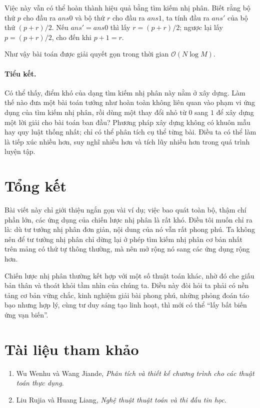 \documentclass[11pt]{article}
\newcommand{\Oh}{\mathcal{O}}
\begin{document}
Việc này vẫn có thể hoàn thành hiệu quả bằng tìm kiếm nhị phân. Biết rằng bộ
thứ $p$ cho đầu ra $\mathit{ans0}$ và bộ thứ $r$ cho đầu ra $\mathit{ans1}$,
ta tính đầu ra $\mathit{ans'}$ của bộ thứ $(p+r)/2$. Nếu
$\mathit{ans'}=\mathit{ans0}$ thì lấy $r=(p+r)/2$; ngược lại lấy
$p=(p+r)/2$, cho đến khi $p+1=r$.

Như vậy bài toán được giải quyết gọn trong thời gian $\Oh(N\log M)$.

\paragraph{Tiểu kết.}
Có thể thấy, điểm khó của dạng tìm kiếm nhị phân này nằm ở xây dựng. Làm thế
nào đưa một bài toán tưởng như hoàn toàn không liên quan vào phạm vi ứng dụng
của tìm kiếm nhị phân, rồi dùng một thay đổi nhỏ từ $0$ sang $1$ để xây dựng
một lời giải cho bài toán ban đầu? Phương pháp xây dựng không có khuôn mẫu hay
quy luật thống nhất; chỉ có thể phân tích cụ thể từng bài. Điều ta có thể làm
là tiếp xúc nhiều hơn, suy nghĩ nhiều hơn và tích lũy nhiều hơn trong quá
trình luyện tập.

\section{Tổng kết}

Bài viết này chỉ giới thiệu ngắn gọn vài ví dụ; việc bao quát toàn bộ, thậm
chí phần lớn, các ứng dụng của chiến lược nhị phân là rất khó. Điều tôi muốn
chỉ ra là: dù tư tưởng nhị phân đơn giản, nội dung của nó vẫn rất phong phú.
Ta không nên để tư tưởng nhị phân chỉ dừng lại ở phép tìm kiếm nhị phân cơ bản
nhất trên mảng có thứ tự thông thường, mà nên mở rộng nó sang các ứng dụng
rộng hơn.

Chiến lược nhị phân thường kết hợp với một số thuật toán khác, nhờ đó che giấu
bản thân và thoát khỏi tầm nhìn của chúng ta. Điều này đòi hỏi ta phải có nền
tảng cơ bản vững chắc, kinh nghiệm giải bài phong phú, những phỏng đoán táo
bạo nhưng hợp lý, cùng tư duy sáng tạo linh hoạt, thì mới có thể ``lấy bất
biến ứng vạn biến''.

\section*{Tài liệu tham khảo}

\begin{enumerate}
  \item Wu Wenhu và Wang Jiande, \textit{Phân tích và thiết kế chương trình
  cho các thuật toán thực dụng}.
  \item Liu Rujia và Huang Liang, \textit{Nghệ thuật thuật toán và thi đấu tin
  học}.
\end{enumerate}
\end{document}
